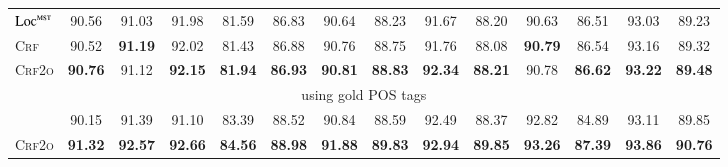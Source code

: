 \begin{table*}[tb]
\begin{tabularx}{\textwidth}{lccccccccccccc}
		$\textsc{Loc}^{\textsc{mst}}$     & 90.56          & 91.03          & 91.98                            & 81.59                           & 86.83                           & 90.64                            & 88.23                           & 91.67                            & 88.20                            & 90.63                           & 86.51                            & 93.03                            & 89.23                            \\
		\textsc{Crf}                      & 90.52          & \textbf{91.19} & 92.02                            & 81.43                           & 86.88\rlap{$^\dagger$}          & 90.76\rlap{$^\dagger$}           & 88.75                           & 91.76                            & 88.08                            & \textbf{90.79}                  & 86.54                            & 93.16\rlap{$^\ddagger$}          & 89.32\rlap{$^\ddagger$}          \\
		\textsc{Crf2o}                    & \textbf{90.76} & 91.12          & \textbf{92.15}\rlap{$^\ddagger$} & \textbf{81.94}                  & \textbf{86.93}\rlap{$^\dagger$} & \textbf{90.81}\rlap{$^\ddagger$} & \textbf{88.83}\rlap{$^\dagger$} & \textbf{92.34}\rlap{$^\ddagger$} & \textbf{88.21}\rlap{$^\dagger$}  & 90.78                           & \textbf{86.62}                   & \textbf{93.22}\rlap{$^\ddagger$} & \textbf{89.48}\rlap{$^\ddagger$} \\
		\multicolumn{14}{c}{using gold POS tags}                                                                                                                                                                                                                                                                                                                                                                                                                         \\[1pt]
		\citet{zhang-etal-2019-empirical} & 90.15          & 91.39          & 91.10                            & 83.39                           & 88.52                           & 90.84                            & 88.59                           & 92.49                            & 88.37                            & 92.82                           & 84.89                            & 93.11                            & 89.85                            \\
		\textsc{Crf2o}                    & \textbf{91.32} & \textbf{92.57} & \textbf{92.66}                   & \textbf{84.56}                  & \textbf{88.98}                  & \textbf{91.88}                   & \textbf{89.83}                  & \textbf{92.94}                   & \textbf{89.85}                   & \textbf{93.26}                  & \textbf{87.39}                   & \textbf{93.86}                   & \textbf{90.76}                   \\
		\bottomrule
	\end{tabularx}
	\label{table:ud-test}
\end{table*}

